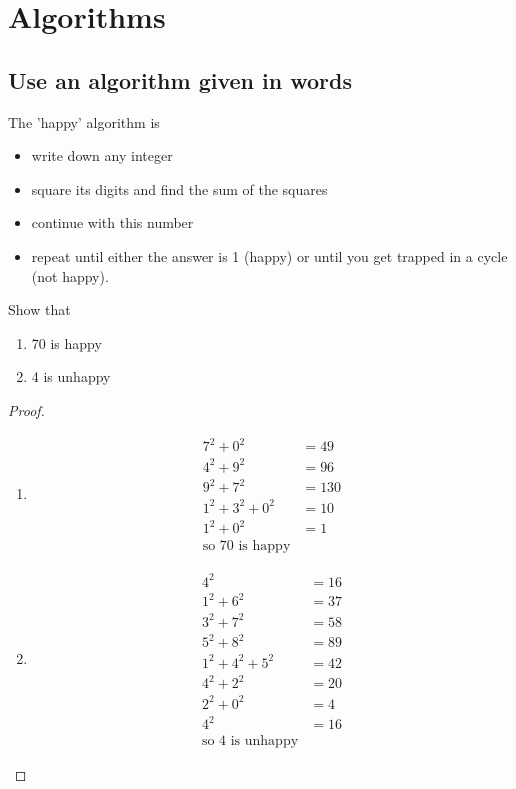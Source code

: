 \documentclass[a4paper]{article}
\begin{document}
\maketitle

\tableofcontents

\section{Algorithms}
\subsection{Use an algorithm given in words}
\begin{eg}
The 'happy' algorithm is
\begin{itemize}
\item write down any integer
\item square its digits and find the sum of the squares
\item continue with this number
\item repeat until either the answer is 1 (happy) or until you get trapped in a cycle (not happy).
\end{itemize}
Show that
\begin{enumerate}
\item 70 is happy
\item 4 is unhappy
\end{enumerate}
\begin{proof}
\begin{enumerate}
\item \begin{align*} 7^2+0^2&=49 \\ 4^2+9^2 &= 96 \\ 9^2+7^2 &= 130 \\ 1^2+3^2 + 0^2 &=10 \\1^2 +0^2 &=1 \\ \text{so 70 is happy} \end{align*}
\item  \begin{align*} 4^2 &=16 \\ 1^2+6^2 &=37 \\ 3^2+7^2 &= 58 \\ 5^2+8^2 &= 89 \\ 1^2+4^2+5^2 &= 42 \\ 4^2+2^2 &= 20 \\ 2^2+0^2 &= 4 \\ 4^2 &=16 \\ \text{so 4 is unhappy} \end{align*}
\end{enumerate}
\end{proof}
\end{eg}
\end{document}
